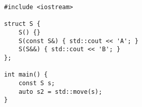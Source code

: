 \begin{lstlisting}[title=\href{https://godbolt.org/z/3AotWt}{\texttt{godbolt.org/z/3AotWt}}]
#include <iostream>

struct S {
    S() {}
    S(const S&) { std::cout << 'A'; }
    S(S&&) { std::cout << 'B'; }
};

int main() {
    const S s;
    auto s2 = std::move(s);
}
\end{lstlisting}
